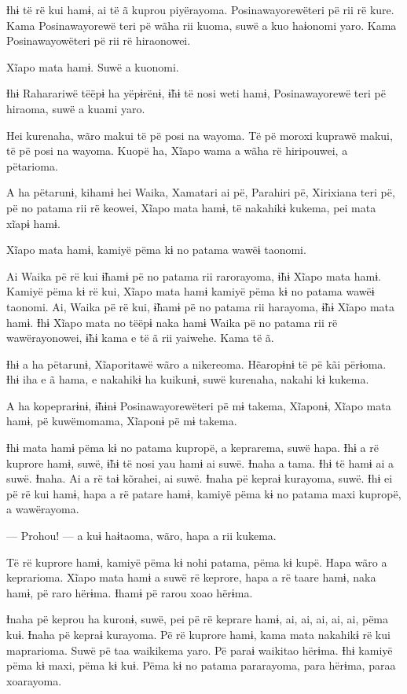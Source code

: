  

 

Ɨhɨ të rë kui hamɨ, ai të ã kuprou piyërayoma. Posinawayorewëteri pë rii
rë kure. Kama Posinawayorewë teri pë wãha rii kuoma, suwë a kuo haɨonomi
yaro. Kama Posinawayowëteri pë rii rë hiraonowei. 

Xĩapo mata hamɨ. Suwë a kuonomi. 

Ɨhɨ Raharariwë tëëpɨ ha yëpɨrënɨ, ɨ̃hɨ të nosi weti hamɨ, Posinawayorewë
teri pë hiraoma, suwë a kuami yaro. 

Hei kurenaha, wãro makui të pë posi na wayoma. Të pë moroxi kuprawë
makui, të pë posi na wayoma. Kuopë ha, Xĩapo wama a wãha rë hiripouwei,
a pëtarioma. 

A ha pëtarunɨ, kihamɨ hei Waika, Xamatari ai pë, Parahiri pë, Xirixiana
teri pë, pë no patama rii rë keowei, Xĩapo mata hamɨ, të nakahikɨ
kukema, pei mata xĩapɨ hamɨ. 

Xĩapo mata hamɨ, kamiyë pëma kɨ no patama wawëɨ taonomi. 

Ai Waika pë rë kui ɨ̃hamɨ pë no patama rii rarorayoma, ɨ̃hɨ Xĩapo mata
hamɨ. Kamiyë pëma kɨ rë kui, Xĩapo mata hamɨ kamiyë pëma kɨ no patama
wawëɨ taonomi. Ai, Waika pë rë kui, ɨ̃hamɨ pë no patama rii harayoma, ɨ̃hɨ
Xĩapo mata hamɨ. Ɨhɨ Xĩapo mata no tëëpɨ naka hamɨ Waika pë no patama
rii rë wawërayonowei, ɨ̃hɨ kama e të ã rii yaiwehe. Kama të ã. 

Ɨhɨ a ha pëtarunɨ, Xĩaporitawë wãro a nikereoma. Hẽaropɨnɨ të pë kãi
përɨoma. Ɨhɨ iha e ã hama, e nakahikɨ ha kuikunɨ, suwë kurenaha, nakahi
kɨ kukema. 

A ha kopeprarɨnɨ, ɨ̃hɨnɨ Posinawayorewëteri pë mɨ takema, Xĩaponɨ, Xĩapo
mata hamɨ, pë kuwëmomama, Xĩaponɨ pë mɨ takema. 

Ɨhɨ mata hamɨ pëma kɨ no patama kupropë, a keprarema, suwë hapa. Ɨhɨ a
rë kuprore hamɨ, suwë, ɨ̃hɨ të nosi yau hamɨ ai suwë. Ɨnaha a tama. Ɨhɨ
të hamɨ ai a suwë. Ɨnaha. Ai a rë taɨ kõrahei, ai suwë. Ɨnaha pë kepraɨ
kurayoma, suwë. Ɨhɨ ei pë rë kui hamɨ, hapa a rë patare hamɨ, kamiyë
pëma kɨ no patama maxi kupropë, a wawërayoma. 

— Prohou! --- a kuɨ haɨtaoma, wãro, hapa a rii kukema. 

Të rë kuprore hamɨ, kamiyë pëma kɨ nohi patama, pëma kɨ kupë. Hapa wãro
a keprarioma. Xĩapo mata hamɨ a suwë rë keprore, hapa a rë taare hamɨ,
naka hamɨ, pë raro hërɨma. Ɨhamɨ pë rarou xoao hërɨma. 

Ɨnaha pë keprou ha kuronɨ, suwë, pei pë rë keprare hamɨ, ai, ai, ai, ai,
ai, pëma kuɨ. Ɨnaha pë kepraɨ kurayoma. Pë rë kuprore hamɨ, kama mata
nakahikɨ rë kui maprarioma. Suwë pë taa waikikema yaro. Pë paraɨ
waikitao hërɨma. Ɨhɨ kamiyë pëma kɨ maxi, pëma kɨ kuɨ. Pëma kɨ no patama
pararayoma, para hërɨma, paraa xoarayoma. 

